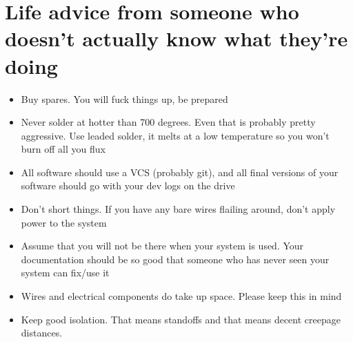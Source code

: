 \documentclass{article}
\begin{document}
\section{Life advice from someone who doesn't actually know what they're doing}
\begin{itemize}
\item Buy spares. You will fuck things up, be prepared
\item Never solder at hotter than 700 degrees. Even that is probably pretty aggressive. Use leaded solder, it melts at a low temperature so you won't burn off all you flux
\item All software should use a VCS (probably git), and all final versions of your software should go with your dev logs on the drive
\item Don't short things. If you have any bare wires flailing around, don't apply power to the system
\item Assume that you will not be there when your system is used. Your documentation should be so good that someone who has never seen your system can fix/use it
\item Wires and electrical components do take up space. Please keep this in mind
\item Keep good isolation. That means standoffs and that means decent creepage distances.
\end{itemize}
\end{document}
